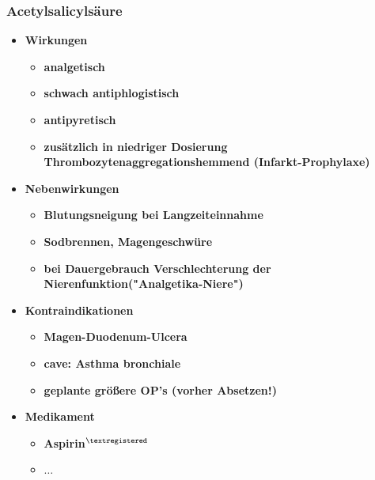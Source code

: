 \subsubsection{Acetylsalicylsäure}
	\begin{itemize}
		\item \textbf{Wirkungen}
			\begin{itemize}
				\item \textbf{analgetisch}
				\item \textbf{schwach antiphlogistisch}
				\item \textbf{antipyretisch}
				\item \textbf{zusätzlich in niedriger Dosierung Thrombozytenaggregationshemmend (Infarkt-Prophylaxe)}
			\end{itemize}
		\item \textbf{Nebenwirkungen}
			\begin{itemize}
				\item \textbf{Blutungsneigung bei Langzeiteinnahme}
				\item \textbf{Sodbrennen, Magengeschwüre}
				\item \textbf{bei Dauergebrauch Verschlechterung der Nierenfunktion("Analgetika-Niere")}
			\end{itemize}
		\item \textbf{Kontraindikationen}
			\begin{itemize}
				\item \textbf{Magen-Duodenum-Ulcera}
				\item \textbf{cave: Asthma bronchiale}
				\item \textbf{geplante größere OP's (vorher Absetzen!)}
			\end{itemize}
		\item \textbf{Medikament}
			\begin{itemize}
				\item \textbf{Aspirin$^{\textregistered}$}
				\item \textbf{$\dots$}
			\end{itemize}
	\end{itemize}
		

